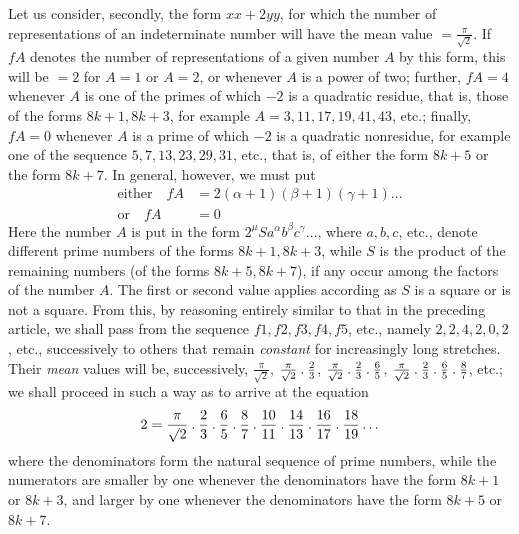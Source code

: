 \clearpage
{}
Let us consider, secondly, the form $xx+2yy$, for which the number of representations of an indeterminate number will have the mean value $=\frac\pi{\surd2}$. If $fA$ denotes the number of representations of a given number $A$ by this form, this will be $=2$ for $A=1$ or $A=2$, or whenever $A$ is a power of two; further, $fA=4$ whenever $A$ is one of the primes of which $-2$ is a quadratic residue, that is, those of the forms $8k+1,8k+3$, for example $A=3,11,17,19,41,43$, etc.; finally, $fA=0$ whenever $A$ is a prime of which $-2$ is a quadratic nonresidue, for example one of the sequence $5,7,13,23,29,31$, etc., that is, of either the form $8k+5$ or the form $8k+7$. In general, however, we must put
\[
\begin{aligned}
\text{either}\quad fA&=2(\alpha+1)(\beta+1)(\gamma+1)\ldots\\
\text{or}\quad fA&=0
\end{aligned}
\]
Here the number $A$ is put in the form $2^\mu Sa^\alpha b^\beta c^\gamma\ldots$, where $a,b,c$, etc., denote different prime numbers of the forms $8k+1,8k+3$, while $S$ is the product of the
remaining numbers (of the forms $8k+5,8k+7$), if any occur among the factors of the number $A$. The first or second value applies according as $S$ is a square or is not a square. From this, by reasoning entirely similar to that in the preceding article, we shall pass from the sequence $f1,f2,f3,f4,f5$, etc., namely $2,2,4,2,0,2$, etc., successively to others that remain \emph{constant} for increasingly long stretches. Their \emph{mean} values will be, successively, $\frac\pi{\surd2}$, $\frac\pi{\surd2}\mathbin{.}\frac23$, $\frac\pi{\surd2}\mathbin{.}\frac23\mathbin{.}\frac65$, $\frac\pi{\surd2}\mathbin{.}\frac23\mathbin{.}\frac65\mathbin{.}\frac87$, etc.; we shall proceed in such a way as to arrive at the equation
\[
2=\frac\pi{\surd2}\mathbin{.}\frac23\mathbin{.}\frac65\mathbin{.}\frac87\mathbin{.}\frac{10}{11}\mathbin{.}\frac{14}{13}\mathbin{.}\frac{16}{17}\mathbin{.}\frac{18}{19}\ldots
\]
where the denominators form the natural sequence of prime numbers, while the numerators are smaller by one whenever the denominators have the form $8k+1$ or $8k+3$, and larger by one whenever the denominators have the form $8k+5$ or $8k+7$.
